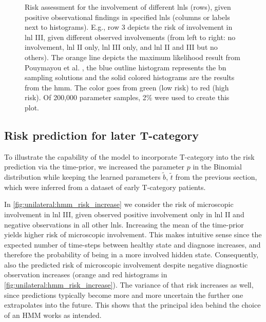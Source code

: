 \documentclass[\relativeRoot/main.tex]{subfiles}
\begin{document}
\begin{figure}
    \centering
    \def\svgwidth{1.0\textwidth}
    
    \caption{Risk assessment for the involvement of different \glspl{lnl} (rows), given positive observational findings in specified \glspl{lnl} (columns or labels next to histograms). E.g., row 3 depicts the risk of involvement in \gls{lnl} III, given different observed involvements (from left to right: no involvement, \gls{lnl} II only, \gls{lnl} III only, and \gls{lnl} II and III but no others). The orange line depicts the maximum likelihood result from Pouymayou et al. \cite{pouymayou_bayesian_2019}, the blue outline histogram represents the \gls{bn} sampling solutions and the solid colored histograms are the results from the \gls{hmm}. The color goes from green (low risk) to red (high risk). Of 200,000 parameter samples, 2\% were used to create this plot.}
    \label{fig:unilateral:hmm_bn_comp}
\end{figure}

\subsection{Risk prediction for later T-category}
\label{subsec:unilateral:application:late_risk}

To illustrate the capability of the model to incorporate T-category into the risk prediction via the time-prior, we increased the parameter $p$ in the Binomial distribution while keeping the learned parameters $\tilde{b}$, $\tilde{t}$ from the previous section, which were inferred from a dataset of early T-category patients.

In \cref{fig:unilateral:hmm_risk_increase} we consider the risk of microscopic involvement in \gls{lnl} III, given observed positive involvement only in \gls{lnl} II and negative observations in all other \glspl{lnl}. Increasing the mean of the time-prior yields higher risk of microscopic involvement. This makes intuitive sense since the expected number of time-steps between healthy state and diagnose increases, and therefore the probability of being in a more involved hidden state. Consequently, also the predicted risk of microscopic involvement despite negative diagnostic observation increases (orange and red histograms in \cref{fig:unilateral:hmm_risk_increase}). The variance of that risk increases as well, since predictions typically become more and more uncertain the further one extrapolates into the future. This shows that the principal idea behind the choice of an HMM works as intended.
\end{document}
